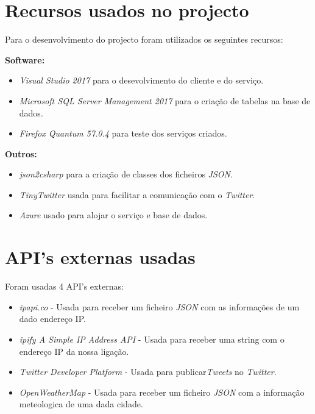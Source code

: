 \documentclass[11pt]{report}
\begin{document}
\clearpage


\chapter*{Recursos usados no projecto}

Para o desenvolvimento do projecto foram utilizados os seguintes recursos:

\textbf{Software:}
\begin{itemize}
\item \textit{Visual Studio 2017} para o desevolvimento do cliente e do serviço.
\item \textit{Microsoft SQL Server Management 2017} para o criação de tabelas na base de dados.
\item \textit{Firefox Quantum 57.0.4} para teste dos serviços criados.
\end{itemize}

\textbf{Outros:}
\begin{itemize}
\item \textit{json2csharp} para a criação de classes dos ficheiros \textit{JSON}. \cite{json2csharp}
\item \textit{TinyTwitter} usada para facilitar a comunicação com o \textit{Twitter}.\cite{TinyTwitter}
\item \textit{Azure} usado para alojar o serviço e base de dados. \cite{TinyTwitter}
\end{itemize}



\chapter*{API's externas usadas}

Foram usadas 4 API's externas:

\begin{itemize}
\item \textit{ipapi.co} - Usada para receber um ficheiro \textit{JSON} com as informações de um dado endereço IP.\cite{ipapi}
\item \textit{ipify  A  Simple IP Address API} - Usada para receber uma string com o endereço IP da nossa ligação.\cite{ipify}
\item \textit{Twitter Developer Platform} - Usada para publicar\textit{Tweets}  no \textit{Twitter}. \cite{twitter}
\item \textit{OpenWeatherMap} - Usada para receber um ficheiro \textit{JSON} com a informação meteologica de uma dada cidade. \cite{Weather}
\end{itemize}
\end{document}
